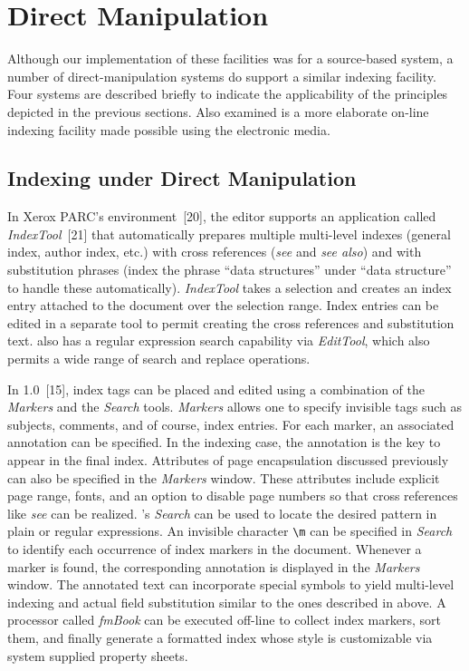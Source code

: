 \section{Direct Manipulation}
Although our implementation of these facilities was for a source-based system,
a number of direct-manipulation systems do support a similar indexing facility.
Four systems are described briefly to indicate
the applicability of the principles depicted in the previous sections.
Also examined is a more elaborate on-line
indexing facility made possible using the electronic media.


\subsection{Indexing under Direct Manipulation}
In Xerox PARC's {\CD} environment~[20],
the {\TG} editor supports an
application called {\sl IndexTool\/}~[21]
that automatically prepares multiple
multi-level indexes (general index, author index, etc.) with cross
references ({\it see\/} and {\it see also\/})
and with substitution phrases (index the
phrase ``data structures'' under ``data structure'' to handle these
automatically).  {\sl IndexTool\/} takes a selection and creates an
index entry attached to the document over the selection range.  Index
entries can be edited in a separate tool to permit creating the cross
references and substitution text.  {\TG} also has a regular expression search
capability via {\sl EditTool\/}, which also
permits a wide range of search and replace operations.

In {\FM} 1.0~[15], index tags can be placed and edited
using a combination of the {\sl Markers\/} and the {\sl Search\/} tools.
{\sl Markers\/} allows one to specify invisible tags such as
subjects, comments, and of course, index entries.
For each marker, an associated annotation can be specified.
In the indexing case, the annotation is the key to appear in the final index.
Attributes of page encapsulation discussed previously can also be specified
in the {\sl Markers\/} window.
These attributes include explicit page range, fonts, and an option to disable
page numbers so that cross references like {\it see\/} can be realized.
{\FM}'s {\sl Search\/} can be used to locate the desired pattern in plain
or regular expressions.  An invisible character \verb|\m|
can be specified in {\sl Search\/} to identify each occurrence
of index markers in the document.
Whenever a marker is found, the corresponding
annotation is displayed in the {\sl Markers\/} window.
The annotated text can incorporate special symbols to yield
multi-level indexing and actual field substitution similar to the ones
described in above.  A processor called
{\sl fmBook\/} can be executed off-line to collect index markers,
sort them, and finally generate a formatted index whose style
is customizable via system supplied property sheets.

